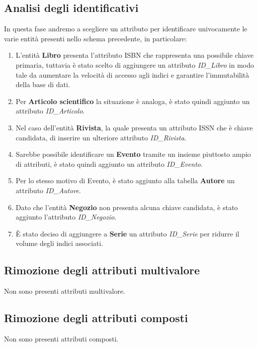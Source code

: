         \subsection{Analisi degli identificativi}
        In questa fase andremo a scegliere un attributo per identificare univocamente
        le varie entit\`a presenti nello schema precedente, in particolare:
            \begin{enumerate}
            \item L'entit\`a \textbf{Libro} presenta l'attributo ISBN che rappresenta una possibile chiave primaria,
                  tuttavia \`e stato scelto di aggiungere un attributo \textit{ID\_Libro} in modo tale da aumentare
                  la velocit\`a di accesso agli indici e garantire l'immutabilit\`a della base di dati.
            \item Per \textbf{Articolo scientifico} la situazione \`e analoga, \`e stato quindi aggiunto un attributo
                  \textit{ID\_Articolo}.
            \item Nel caso dell'entit\`a \textbf{Rivista}, la quale presenta un attributo ISSN che \`e chiave candidata,
                  di inserire un ulteriore attributo \textit{ID\_Rivista}.
            \item Sarebbe possibile identificare un \textbf{Evento} tramite un insieme piuttosto ampio di attributi, \`e
                  stato quindi aggiunto un attributo \textit{ID\_Evento}.
            \item Per lo stesso motivo di Evento, \`e stato aggiunto alla tabella \textbf{Autore} un attributo \textit{ID\_Autore}.
            \item Dato che l'entit\`a \textbf{Negozio} non presenta alcuna chiave candidata, \`e stato aggiunto l'attributo
                  \textit{ID\_Negozio}.
            \item \`E stato deciso di aggiungere a \textbf{Serie} un attributo \textit{ID\_Serie} per ridurre il volume degli
                  indici associati.
            \end{enumerate}
        \subsection{Rimozione degli attributi multivalore}
            Non sono presenti attributi multivalore.
        \subsection{Rimozione degli attributi composti}
            Non sono presenti attributi composti.
